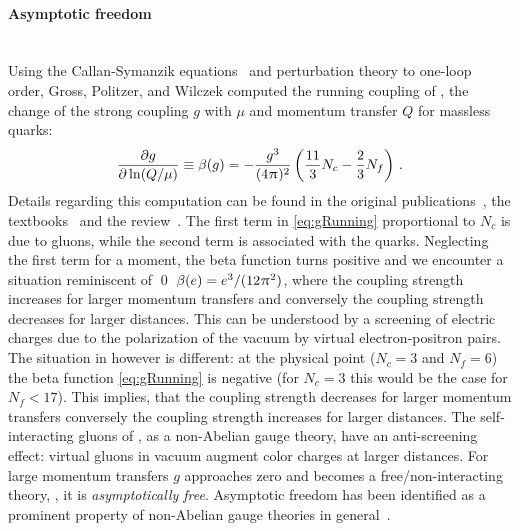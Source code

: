 \paragraph{Asymptotic freedom}\label{paragraph:qcdAS}\mbox{}\\%
Using the Callan-Symanzik equations~\cite{Callan:1970yg,Symanzik:1970rt,Symanzik:1971vw} and perturbation theory to one-loop order, Gross, Politzer, and Wilczek computed the running coupling of \qcd{} \dash{} \ie{}, the change of the strong coupling $g$ with \rgscale{} $\mu$ and momentum transfer $Q$ for massless quarks:
\begin{align}
\frac{\partial g}{\partial\ln(Q/\mu)}\equiv \beta(g)=-\frac{g^3}{(4\piu)^2}\del{\frac{11}{3}N_c-\frac{2}{3}N_f}\, .
\label{eq:gRunning}
\end{align}
Details regarding this computation can be found in the original publications~\cite{Gross:1973id,Politzer:1973fx}, the textbooks~\cite{Ryder1996Jun,Peskin:1995ev,Burgess2006Dec,Greiner2007,Schwartz2013Dec} and the review~\cite{Deur:2016tte}.
The first term in \cref{eq:gRunning} proportional to $N_c$ is due to gluons, while the second term is associated with the quarks.
Neglecting the first term for a moment, the beta function turns positive and we encounter a situation reminiscent of \qed{} \dash{} $\beta(e)=e^3/(12\mkern1.0mu\uppi\mkern1.0mu^2)$, where the coupling strength increases for larger momentum transfers and conversely the coupling strength decreases for larger distances.
This can be understood by a screening of electric charges due to the polarization of the vacuum by virtual electron-positron pairs.
The situation in \qcd{} however is different: at the physical point ($N_c=3$ and $N_f=6$) the \qcd{} beta function \eqref{eq:gRunning} is negative (for $N_c=3$ this would be the case for $N_f<17$).
This implies, that the coupling strength decreases for larger momentum transfers \dash{} conversely the coupling strength increases for larger distances.
The self-interacting gluons of \qcd{}, as a non-Abelian gauge theory, have an anti-screening effect: virtual gluons in vacuum augment color charges at larger distances.
For large momentum transfers $g$ approaches zero and \qcd{} becomes a free/non-interacting theory, \ie{}, it is \textit{asymptotically free}.
Asymptotic freedom has been identified as a prominent property of non-Abelian gauge theories in general~\cite{Coleman1973Sep}.


